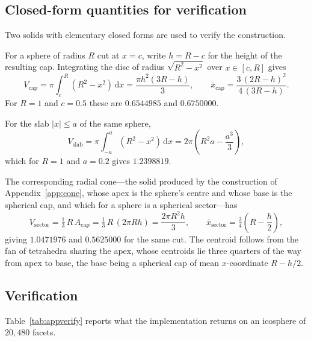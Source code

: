 \subsection{Closed-form quantities for verification}
\label{app:clip:analytic}

Two solids with elementary closed forms are used to verify the construction.

For a sphere of radius $R$ cut at $x = c$, write $h = R - c$ for the height of
the resulting cap. Integrating the disc of radius $\sqrt{R^2 - x^2}$ over
$x \in [c, R]$ gives
\begin{equation}
V_{\mathrm{cap}} = \pi \int_{c}^{R} (R^2 - x^2)\,\mathrm{d}x
= \frac{\pi h^{2} (3R - h)}{3},
\qquad
\bar{x}_{\mathrm{cap}} = \frac{3\,(2R - h)^{2}}{4\,(3R - h)} .
\label{eq:appcap}
\end{equation}
For $R = 1$ and $c = 0.5$ these are $0.6544985$ and $0.6750000$.

For the slab $|x| \le a$ of the same sphere,
\begin{equation}
V_{\mathrm{slab}} = \pi \int_{-a}^{a} (R^2 - x^2)\,\mathrm{d}x
= 2\pi\!\left( R^{2} a - \frac{a^{3}}{3} \right),
\label{eq:appslab}
\end{equation}
which for $R = 1$ and $a = 0.2$ gives $1.2398819$.

The corresponding radial cone---the solid produced by the construction of
Appendix~\ref{app:cone}, whose apex is the sphere's centre and whose base is
the spherical cap, and which for a sphere is a spherical sector---has
\begin{equation}
V_{\mathrm{sector}} = \tfrac{1}{3}\,R\,A_{\mathrm{cap}}
= \tfrac{1}{3}\,R\,(2\pi R h)
= \frac{2\pi R^{2} h}{3},
\qquad
\bar{x}_{\mathrm{sector}} = \tfrac{3}{4}\!\left( R - \frac{h}{2} \right),
\label{eq:appcone}
\end{equation}
giving $1.0471976$ and $0.5625000$ for the same cut. The centroid follows from
the fan of tetrahedra sharing the apex, whose centroids lie three quarters of
the way from apex to base, the base being a spherical cap of mean
$x$-coordinate $R - h/2$.

\subsection{Verification}
\label{app:clip:verify}

Table~\ref{tab:appverify} reports what the implementation returns on an
icosphere of $20{,}480$ facets.

